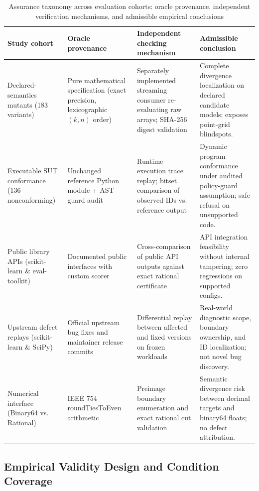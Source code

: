 \documentclass[11pt,a4paper]{article}
\begin{document}
\begin{table}[!htbp]
\caption{Assurance taxonomy across evaluation cohorts: oracle provenance, independent verification mechanisms, and admissible empirical conclusions}\label{tab:assurance_taxonomy}
\centering
\footnotesize
\setlength{\tabcolsep}{3pt}
\renewcommand{\arraystretch}{1.15}
\begin{tabularx}{\textwidth}{@{} >{\raggedright\arraybackslash}p{2.3cm} >{\raggedright\arraybackslash}p{2.6cm} >{\raggedright\arraybackslash}X >{\raggedright\arraybackslash}X @{}}
\toprule
\textbf{Study cohort} & \textbf{Oracle provenance} & \textbf{Independent checking mechanism} & \textbf{Admissible conclusion} \\
\midrule
Declared-semantics mutants (183 variants) & Pure mathematical specification (exact precision, lexicographic $(k, n)$ order) & Separately implemented streaming consumer re-evaluating raw arrays; SHA-256 digest validation & Complete divergence localization on declared candidate models; exposes point-grid blindspots. \\
\midrule
Executable SUT conformance (136 nonconforming) & Unchanged reference Python module + AST guard audit & Runtime execution trace replay; bitset comparison of observed IDs vs. reference output & Dynamic program conformance under audited policy-guard assumption; safe refusal on unsupported code. \\
\midrule
Public library APIs (scikit-learn \& eval-toolkit) & Documented public interfaces with custom scorer & Cross-comparison of public API outputs against exact rational certificate & API integration feasibility without internal tampering; zero regressions on supported configs. \\
\midrule
Upstream defect replays (scikit-learn \& SciPy) & Official upstream bug fixes and maintainer release commits & Differential replay between affected and fixed versions on frozen workloads & Real-world diagnostic scope, boundary ownership, and ID localization; not novel bug discovery. \\
\midrule
Numerical interface (Binary64 vs. Rational) & IEEE 754 roundTiesToEven arithmetic & Preimage boundary enumeration and exact rational cut validation & Semantic divergence risk between decimal targets and binary64 floats; no defect attribution. \\
\bottomrule
\end{tabularx}
\end{table}
\FloatBarrier


\subsection{Empirical Validity Design and Condition Coverage}\label{subsec:boundary}
\end{document}
